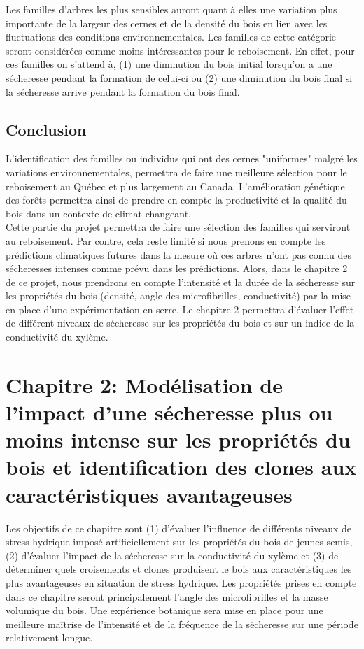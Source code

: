 \documentclass[a4paper,12pt]{report}
\begin{document}
Les familles d'arbres les plus sensibles auront quant à elles une variation plus importante de la largeur des cernes et de la densité du bois en lien avec les fluctuations des conditions environnementales. Les familles de cette catégorie seront considérées comme moins intéressantes pour le reboisement. En effet, pour ces familles on s'attend à, (1) une diminution du bois initial lorsqu'on a une sécheresse pendant la formation de celui-ci ou (2) une diminution du bois final si la sécheresse arrive pendant la formation du bois final.\\


\section{Conclusion}

L'identification des familles ou individus qui ont des cernes "uniformes" malgré les variations environnementales, permettra de faire une meilleure sélection pour le reboisement au Québec et plus largement au Canada. L'amélioration génétique des forêts permettra ainsi de prendre en compte la productivité et la qualité du bois dans un contexte de climat changeant.\\

Cette partie du projet permettra de faire une sélection des familles qui serviront au reboisement. Par contre, cela reste limité si nous prenons en compte les prédictions climatiques futures dans la mesure où ces arbres n'ont pas connu des sécheresses intenses comme prévu dans les prédictions. Alors, dans le chapitre 2 de ce projet, nous prendrons en compte l'intensité et la durée de la sécheresse sur les propriétés du bois (densité, angle des microfibrilles, conductivité) par la mise en place d'une expérimentation en serre. Le chapitre 2 permettra d'évaluer l'effet de différent niveaux de sécheresse sur les propriétés du bois et sur un indice de la conductivité du xylème.



\chapter{Chapitre 2: Modélisation de l'impact d'une sécheresse plus ou moins intense sur les propriétés du bois et identification des clones aux caractéristiques avantageuses}

Les objectifs de ce chapitre sont (1) d'évaluer l'influence de différents niveaux de stress hydrique imposé artificiellement sur les propriétés du bois de jeunes semis, (2) d'évaluer l'impact de la sécheresse sur la conductivité du xylème et (3) de déterminer quels croisements et clones produisent le bois aux caractéristiques les plus avantageuses en situation de stress hydrique. Les propriétés prises en compte dans ce chapitre seront principalement l'angle des microfibrilles et la masse volumique du bois. Une expérience botanique sera mise en place pour une meilleure maîtrise de l'intensité et de la fréquence de la sécheresse sur une période relativement longue.   
\end{document}
